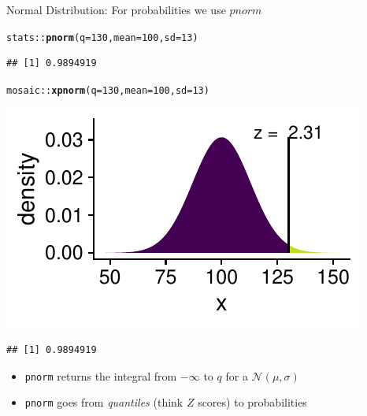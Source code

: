 \documentclass[10pt]{beamer}\usepackage[]{graphicx}\usepackage[]{color}
\makeatletter
\newcommand{\hlnum}[1]{\textcolor[rgb]{0.686,0.059,0.569}{#1}}%
\newcommand{\hlopt}[1]{\textcolor[rgb]{0,0,0}{#1}}%
\newcommand{\hlstd}[1]{\textcolor[rgb]{0.345,0.345,0.345}{#1}}%
\newcommand{\hlkwc}[1]{\textcolor[rgb]{0.333,0.667,0.333}{#1}}%
\newcommand{\hlkwd}[1]{\textcolor[rgb]{0.737,0.353,0.396}{\textbf{#1}}}%
\newenvironment{kframe}{%
 \def\at@end@of@kframe{}%
 \ifinner\ifhmode%
  \def\at@end@of@kframe{\end{minipage}}%
  \begin{minipage}{\columnwidth}%
 \fi\fi%
 \def\FrameCommand##1{\hskip\@totalleftmargin \hskip-\fboxsep
 \colorbox{shadecolor}{##1}\hskip-\fboxsep
     \hskip-\linewidth \hskip-\@totalleftmargin \hskip\columnwidth}%
 \MakeFramed {\advance\hsize-\width
   \@totalleftmargin\z@ \linewidth\hsize
   \@setminipage}}%
 {\par\unskip\endMakeFramed%
 \at@end@of@kframe}
\newenvironment{knitrout}{}{} %
\makeatother
\begin{document}
\begin{frame}[fragile]{Normal Distribution: For probabilities we use $pnorm$}
	
	
\begin{knitrout}\tiny
{}\color{fgcolor}\begin{kframe}
\begin{alltt}
\hlstd{stats}\hlopt{::}\hlkwd{pnorm}\hlstd{(}\hlkwc{q} \hlstd{=} \hlnum{130}\hlstd{,} \hlkwc{mean} \hlstd{=} \hlnum{100}\hlstd{,} \hlkwc{sd} \hlstd{=} \hlnum{13}\hlstd{)}
\end{alltt}
\begin{verbatim}
## [1] 0.9894919
\end{verbatim}
\end{kframe}
\end{knitrout}
	
	
\begin{knitrout}\tiny
{}\color{fgcolor}\begin{kframe}
\begin{alltt}
\hlstd{mosaic}\hlopt{::}\hlkwd{xpnorm}\hlstd{(}\hlkwc{q} \hlstd{=} \hlnum{130}\hlstd{,} \hlkwc{mean} \hlstd{=} \hlnum{100}\hlstd{,} \hlkwc{sd} \hlstd{=} \hlnum{13}\hlstd{)}
\end{alltt}
\end{kframe}

{\centering \includegraphics[width=0.6\linewidth]{figure/probs3-1} 

}


\begin{kframe}\begin{verbatim}
## [1] 0.9894919
\end{verbatim}
\end{kframe}
\end{knitrout}
	
	
	\begin{itemize}
		\item \texttt{pnorm} returns the integral from $-\infty$ to $q$ for a $\mathcal{N}(\mu, \sigma)$
		\item \texttt{pnorm} goes from \textit{quantiles} (think $Z$ scores) to probabilities
	\end{itemize}
	
\end{frame}
\end{document}
